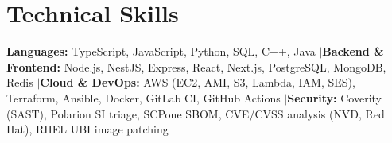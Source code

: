 \section{Technical Skills}
 \begin{itemize}[leftmargin=0.15in, label={}, itemsep=0pt, topsep=0pt, parsep=0pt, partopsep=0pt]
    \small{\item
     \textbf{Languages:} TypeScript, JavaScript, Python, SQL, C++, Java
     \enspace$|$\enspace \textbf{Backend \& Frontend:} Node.js, NestJS, Express, React, Next.js, PostgreSQL, MongoDB, Redis
     \enspace$|$\enspace \textbf{Cloud \& DevOps:} AWS (EC2, AMI, S3, Lambda, IAM, SES), Terraform, Ansible, Docker, GitLab CI, GitHub Actions
     \enspace$|$\enspace \textbf{Security:} Coverity (SAST), Polarion SI triage, SCPone SBOM, CVE/CVSS analysis (NVD, Red Hat), RHEL UBI image patching
    }
 \end{itemize}
